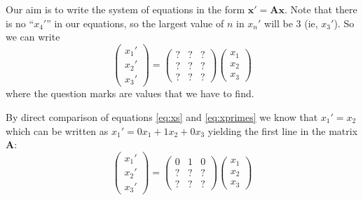 Our aim is to write the system of equations in the form $\bm{x'} = \bm{A}\bm{x}$. Note that there is no ``$x_4'$'' in our equations, so the largest value of $n$ in $x_n'$ will be 3 (ie, $x_3'$). So we can write
\begin{equation}
    \left(
        \begin{array}{c}
            x_1' \\
            x_2' \\
            x_3'
        \end{array}
    \right)
    =
    \left(
        \begin{array}{ccc}
            ? & ? & ? \\
            ? & ? & ? \\
            ? & ? & ?
        \end{array}
    \right)
    \left(
        \begin{array}{c}
            x_1 \\
            x_2 \\
            x_3
        \end{array}
    \right)
\end{equation}
where the question marks are values that we have to find.

By direct comparison of equations \ref{eq:xs} and \ref{eq:xprimes} we know that $x_1' = x_2$ which can be written as $x_1' = 0 x_1 + 1 x_2 + 0 x_3$ yielding the first line in the matrix $\bm{A}$:
\begin{equation}
    \left(
        \begin{array}{c}
            x_1' \\
            x_2' \\
            x_3'
        \end{array}
    \right)
    =
    \left(
        \begin{array}{ccc}
            0 & 1 & 0 \\
            ? & ? & ? \\
            ? & ? & ?
        \end{array}
    \right)
    \left(
        \begin{array}{c}
            x_1 \\
            x_2 \\
            x_3
        \end{array}
    \right)
\end{equation}

